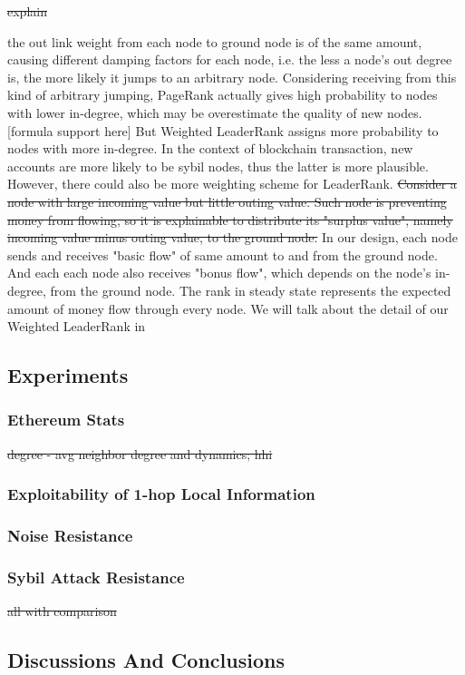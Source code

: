 \st{explain}

 the out link weight from each node to ground node is of the same amount, causing different damping factors for each node, i.e. the less a node's out degree is, the more likely it jumps to an arbitrary node. Considering receiving from this kind of arbitrary jumping, PageRank actually gives high probability to nodes with lower in-degree, which may be overestimate the quality of new nodes.[formula support here] But Weighted LeaderRank\cite{Li2014} assigns more probability to nodes with more in-degree. In the context of blockchain transaction, new accounts are more likely to be sybil nodes, thus the latter is more plausible. However, there could also be more weighting scheme for LeaderRank. \st{Consider a node with large incoming value but little outing value. Such node is preventing money from flowing, so it is explainable to distribute its "surplus value", namely incoming value minus outing value, to the ground node.} In our design, each node sends and receives "basic flow" of same amount to and from the ground node. And each each node also receives "bonus flow", which depends on the node's in-degree, from the ground node. The rank in steady state represents the expected amount of money flow through every node. We will talk about the detail of our Weighted LeaderRank in



\subsection{Experiments} \label{sec:exp}
\subsubsection{Ethereum Stats}
\st{degree - avg neighbor degree and dynamics; hhi}
\subsubsection{Exploitability of 1-hop Local Information}
\subsubsection{Noise Resistance}
\subsubsection{Sybil Attack Resistance}
\st{all with comparison}

\subsection{Discussions And Conclusions} \label{sec:discuss}
